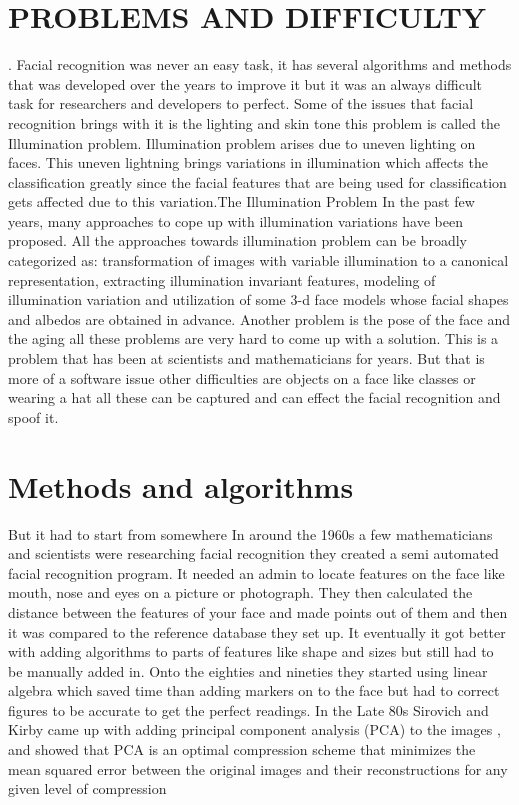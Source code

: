 \documentclass[journal]{IEEEtran}
\begin{document}
\section{
PROBLEMS AND DIFFICULTY
}.\newline
Facial recognition was never an easy task, it has several algorithms and methods that  was developed over the years  to improve it but it was an always difficult task for researchers and developers to perfect. Some of the issues that facial recognition brings with it is the lighting and skin tone this problem is called the Illumination problem. Illumination problem arises due to uneven lighting on faces. This uneven lightning brings variations in illumination which affects the classification greatly since the facial features that are being used for classification gets affected due to this variation.The Illumination Problem In the past few years, many approaches to cope up
with illumination variations have been proposed. All the approaches towards illumination problem can be broadly
categorized as: transformation of images with variable illumination to a canonical representation, extracting
illumination invariant features, modeling of illumination variation and utilization of some 3-d face models whose
facial shapes and albedos are obtained in advance\cite{Illumation}.
Another problem is the pose of the face and the aging all these problems are very hard to come up with a solution. This is a problem that has been at scientists and mathematicians for years. 
But that is more of a software issue other difficulties are objects on a face like classes or wearing a hat all these can be captured and can effect the facial recognition and spoof it\cite{Illumation}. 

\section{Methods and algorithms }
But it had to start from somewhere In around the 1960s a few mathematicians and scientists were researching facial recognition they created a semi automated facial recognition program. It needed an admin to locate features on the face like mouth, nose and eyes on a picture or photograph. They then calculated the distance between the features of your face and made points out of them and then it was compared to the reference database they set up. It eventually it got better with adding algorithms to parts of features like shape and sizes but still had to be manually added in. Onto the eighties and nineties they started using linear algebra which saved time than adding markers on to the face but had to correct figures to be accurate  to get the perfect readings. In the Late 80s Sirovich and Kirby came up with adding principal component analysis (PCA) to the images , and showed that PCA is an optimal compression scheme that minimizes the mean squared error between the original images and their reconstructions for any given level of compression
\end{document}
